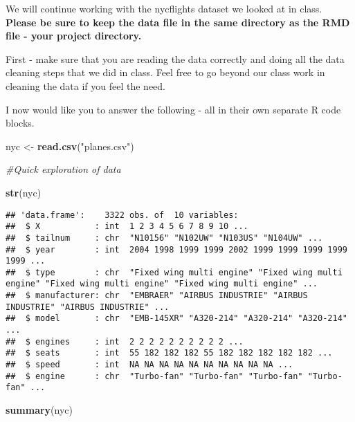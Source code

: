 \documentclass[
]{article}
\newenvironment{Shaded}{\begin{snugshade}}{\end{snugshade}}
\newcommand{\CommentTok}[1]{\textcolor[rgb]{0.56,0.35,0.01}{\textit{#1}}}
\newcommand{\KeywordTok}[1]{\textcolor[rgb]{0.13,0.29,0.53}{\textbf{#1}}}
\newcommand{\NormalTok}[1]{#1}
\newcommand{\StringTok}[1]{\textcolor[rgb]{0.31,0.60,0.02}{#1}}
\begin{document}
We will continue working with the nycflights dataset we looked at in
class. \textbf{Please be sure to keep the data file in the same
directory as the RMD file - your project directory.}

First - make sure that you are reading the data correctly and doing all
the data cleaning steps that we did in class. Feel free to go beyond our
class work in cleaning the data if you feel the need.

I now would like you to answer the following - all in their own separate
R code blocks.

\begin{Shaded}
\begin{Highlighting}[]
\NormalTok{nyc <-}\StringTok{ }\KeywordTok{read.csv}\NormalTok{(}\StringTok{"planes.csv"}\NormalTok{)}

\CommentTok{#Quick exploration of data}

\KeywordTok{str}\NormalTok{(nyc)}
\end{Highlighting}
\end{Shaded}

\begin{verbatim}
## 'data.frame':    3322 obs. of  10 variables:
##  $ X           : int  1 2 3 4 5 6 7 8 9 10 ...
##  $ tailnum     : chr  "N10156" "N102UW" "N103US" "N104UW" ...
##  $ year        : int  2004 1998 1999 1999 2002 1999 1999 1999 1999 1999 ...
##  $ type        : chr  "Fixed wing multi engine" "Fixed wing multi engine" "Fixed wing multi engine" "Fixed wing multi engine" ...
##  $ manufacturer: chr  "EMBRAER" "AIRBUS INDUSTRIE" "AIRBUS INDUSTRIE" "AIRBUS INDUSTRIE" ...
##  $ model       : chr  "EMB-145XR" "A320-214" "A320-214" "A320-214" ...
##  $ engines     : int  2 2 2 2 2 2 2 2 2 2 ...
##  $ seats       : int  55 182 182 182 55 182 182 182 182 182 ...
##  $ speed       : int  NA NA NA NA NA NA NA NA NA NA ...
##  $ engine      : chr  "Turbo-fan" "Turbo-fan" "Turbo-fan" "Turbo-fan" ...
\end{verbatim}

\begin{Shaded}
\begin{Highlighting}[]
\KeywordTok{summary}\NormalTok{(nyc)}
\end{Highlighting}
\end{Shaded}
\end{document}
